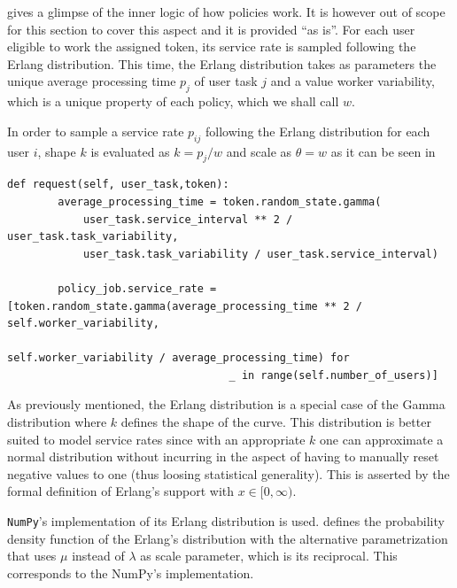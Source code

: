 \documentclass[draft=false]{seal_thesis}
\begin{document}
 gives a glimpse of the inner logic of how policies work. It is however out of scope for this section to cover this aspect and it is provided ``as is''. For each user eligible to work the assigned token, its service rate is sampled following the Erlang distribution. This time, the Erlang distribution takes as parameters the unique average processing time $p_j$ of user task $j$ and a value worker variability, which is a unique property of each policy, which we shall call $w$.

In order to sample a service rate $p_{ij}$ following the Erlang distribution for each user $i$, shape $k$ is evaluated as $k=p_j/w$ and scale as $\theta = w$ as it can be seen in 



\begin{lstlisting}[caption=User service rate sampling following an Erlang distribution,label=lst:user_service_rate,style=CustomPython]
    def request(self, user_task,token):
        average_processing_time = token.random_state.gamma(
            user_task.service_interval ** 2 / user_task.task_variability,
            user_task.task_variability / user_task.service_interval)

        policy_job.service_rate = [token.random_state.gamma(average_processing_time ** 2 / self.worker_variability,
                                                           self.worker_variability / average_processing_time) for
                                   _ in range(self.number_of_users)]
\end{lstlisting}

As previously mentioned, the Erlang distribution is a special case of the Gamma distribution where $k$ defines the shape of the curve. This distribution is better suited to model service rates since with an appropriate $k$ one can approximate a normal distribution without incurring in the aspect of having to manually reset negative values to one (thus loosing statistical generality). This is asserted by the formal definition of Erlang's support with $x \in [0,\infty)$.

\texttt{NumPy}'s implementation of its Erlang distribution is used.  defines the probability density function of the Erlang's distribution with the alternative parametrization that uses $\mu$ instead of $\lambda$ as scale parameter, which is its reciprocal. This corresponds to the NumPy's implementation.
\end{document}
